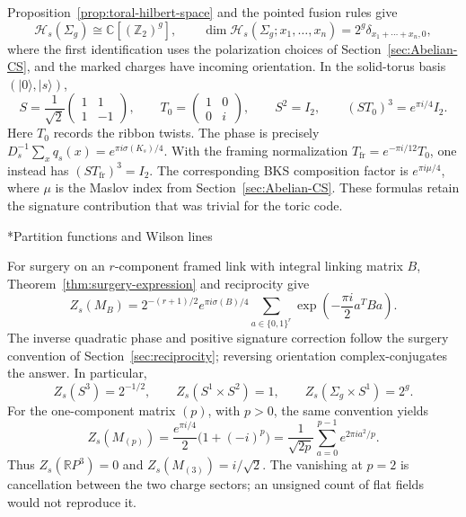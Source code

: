 \documentclass[12pt]{amsart}
\makeatletter
\renewcommand\subsection{\@startsection{subsection}{2}%
  \z@{.5\linespacing\@plus.7\linespacing}{-.5em}%
  {\normalfont\bfseries}}
\numberwithin{equation}{section}
\theoremstyle{definition}
\makeatother
\begin{document}
Proposition~\ref{prop:toral-hilbert-space} and the pointed fusion rules give
\begin{equation}
\label{eq:semion-spaces}
\mathcal H_s(\Sigma_g)\cong\mathbb C[(\mathbb Z_2)^g],\qquad
\dim\mathcal H_s(\Sigma_g;x_1,\ldots,x_n)
=2^g\delta_{x_1+\cdots+x_n,0},
\end{equation}
where the first identification uses the polarization choices of
Section~\ref{sec:Abelian-CS}, and the marked charges have incoming orientation.
In the solid-torus basis $(|0\rangle,|s\rangle)$,
\begin{equation}
\label{eq:semion-modular}
S=\frac1{\sqrt2}\begin{pmatrix}1&1\\1&-1\end{pmatrix},\qquad
T_0=\begin{pmatrix}1&0\\0&i\end{pmatrix},\qquad
S^2=I_2,\qquad (ST_0)^3=e^{\pi i/4}I_2.
\end{equation}
Here $T_0$ records the ribbon twists. The phase is precisely
$D_s^{-1}\sum_xq_s(x)=e^{\pi i\sigma(K_s)/4}$.
With the framing normalization $T_{\mathrm{fr}}=e^{-\pi i/12}T_0$,
one instead has $(ST_{\mathrm{fr}})^3=I_2$.
The corresponding BKS composition factor is
$e^{\pi i\mu/4}$, where $\mu$ is the Maslov index from
Section~\ref{sec:Abelian-CS}. These formulas retain the signature contribution
that was trivial for the toric code.

\subsection*{Partition functions and Wilson lines}

For surgery on an $r$-component framed link with integral linking
matrix $B$, Theorem~\ref{thm:surgery-expression} and reciprocity give
\begin{equation}
\label{eq:semion-surgery}
Z_s(M_B)=2^{-(r+1)/2}e^{\pi i\sigma(B)/4}
\sum_{a\in\{0,1\}^r}\exp\!\left(-\frac{\pi i}{2}a^TBa\right).
\end{equation}
The inverse quadratic phase and positive signature correction follow
the surgery convention of Section~\ref{sec:reciprocity}; reversing
orientation complex-conjugates the answer. In particular,
\begin{equation}
\label{eq:semion-partitions}
Z_s(S^3)=2^{-1/2},\qquad Z_s(S^1\times S^2)=1,\qquad
Z_s(\Sigma_g\times S^1)=2^g.
\end{equation}
For the one-component matrix $(p)$, with $p>0$, the same convention yields
\begin{equation}
\label{eq:semion-lens}
Z_s(M_{(p)})
=\frac{e^{\pi i/4}}2\bigl(1+(-i)^p\bigr)
=\frac1{\sqrt{2p}}\sum_{a=0}^{p-1}e^{2\pi i a^2/p}.
\end{equation}
Thus $Z_s(\mathbb RP^3)=0$ and $Z_s(M_{(3)})=i/\sqrt2$.
The vanishing at $p=2$ is cancellation between the two charge sectors;
an unsigned count of flat fields would not reproduce it.
\end{document}
